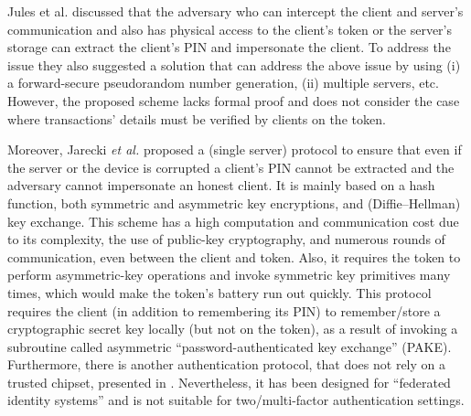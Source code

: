 \begin{enumerate}

Jules et al. \cite{juels2016configurable} discussed that the adversary who can intercept the client and server's communication and also has physical access to the client's token or the server's storage can extract the client's PIN and impersonate the client. To address the issue they also suggested a solution that can address the above issue by using (i) a forward-secure pseudorandom number generation, (ii) multiple servers, etc. However, the proposed scheme lacks formal proof and does not consider the case where transactions' details must be verified by clients on the token.  

Moreover, Jarecki \textit{et al.} \cite{JareckiJKSS21} proposed a (single server) protocol to ensure that even if the server or the device is corrupted a client's PIN cannot be extracted and the adversary cannot impersonate an honest client. It is mainly based on a hash function, both symmetric and asymmetric key encryptions, and (Diffie–Hellman) key exchange. This scheme has a high computation and communication cost due to its complexity,  the use of public-key cryptography, and numerous rounds of communication, even between the client and token. Also, it requires the token to perform asymmetric-key operations and invoke symmetric key primitives many times, which would make the token's battery run out quickly. This protocol requires the client (in addition to remembering its PIN) to remember/store a cryptographic secret key locally (but not on the token), as a result of invoking a subroutine called asymmetric  ``password-authenticated key exchange'' (PAKE). Furthermore, there is another authentication protocol, that does not rely on a trusted chipset, presented in \cite{zhang2020strong}. Nevertheless, it has been designed for ``federated identity systems'' and is not suitable for two/multi-factor authentication settings. 








\end{enumerate}
